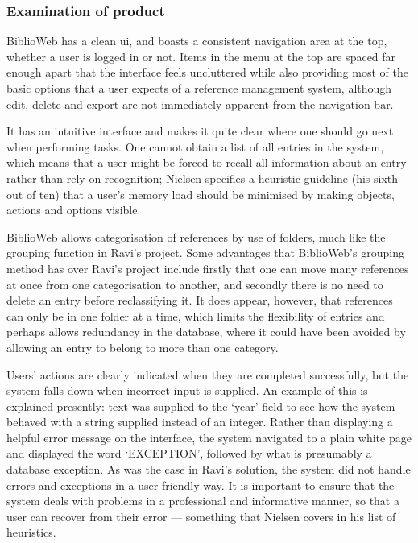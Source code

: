 \documentclass{l4proj}
\begin{document}
\subsubsection{Examination of product}
BiblioWeb has a clean \gls{ui}, and boasts a consistent navigation area at the top, whether a user is logged in or not.  Items in the menu at the top are spaced far enough apart that the interface feels uncluttered while also providing most of the basic options that a user expects of a reference management system, although edit, delete and export are not immediately apparent from the navigation bar. 

It has an intuitive interface and makes it quite clear where one should go next when performing tasks.  One cannot obtain a list of all entries in the system, which means that a user might be forced to recall all information about an entry rather than rely on recognition; Nielsen\cite{NielsenHeuristics} specifies a heuristic guideline (his sixth out of ten) that a user's memory load should be minimised by making objects, actions and options visible.

BiblioWeb allows categorisation of references by use of folders, much like the grouping function in Ravi's project.  Some advantages that BiblioWeb's grouping method has over Ravi's project include firstly that one can move many references at once from one categorisation to another, and secondly there is no need to delete an entry before reclassifying it.  It does appear, however, that references can only be in one folder at a time, which limits the flexibility of entries and perhaps allows redundancy in the database, where it could have been avoided by allowing an entry to belong to more than one category.

Users' actions are clearly indicated when they are completed successfully, but the system falls down when incorrect input is supplied.  An example of this is explained presently: text was supplied to the `year' field to see how the system behaved with a string supplied instead of an integer.  Rather than displaying a helpful error message on the interface, the system navigated to a plain white page and displayed the word `EXCEPTION', followed by what is presumably a database exception.  As was the case in Ravi's solution, the system did not handle errors and exceptions in a user-friendly way.  It is important to ensure that the system deals with problems in a professional and informative manner, so that a user can recover from their error --- something that Nielsen covers in his list of heuristics\cite{NielsenHeuristics}.
\end{document}
